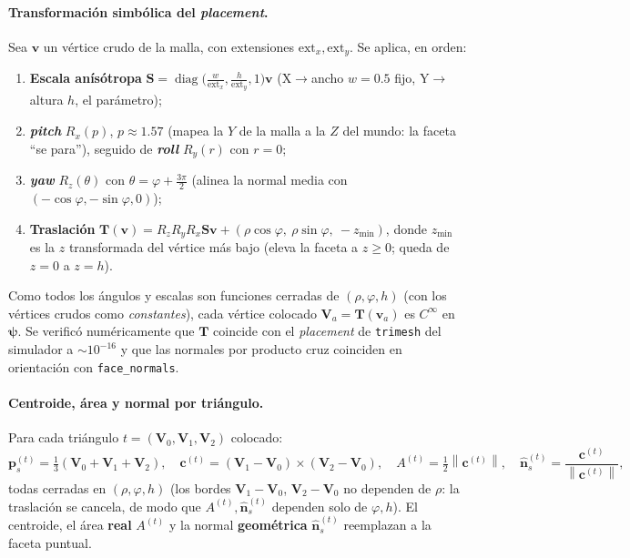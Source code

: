 \documentclass[11pt,a4paper]{article}
\theoremstyle{plain}
\theoremstyle{definition}
\newcommand{\vect}[1]{\boldsymbol{#1}}
\newcommand{\norm}[1]{\left\lVert #1 \right\rVert}
\DeclareMathOperator{\diag}{diag}
\begin{document}
\paragraph{Transformaci\'on simb\'olica del \emph{placement}.} Sea $\vect v$ un
v\'ertice crudo de la malla, con extensiones $\mathrm{ext}_x,\mathrm{ext}_y$. Se
aplica, en orden:
\begin{enumerate}[nosep]
    \item \textbf{Escala an\'is\'otropa} $\vect S=\diag\!\bigl(\tfrac{w}{\mathrm{ext}_x},
    \tfrac{h}{\mathrm{ext}_y},1\bigr)\vect v$ (X$\to$ancho $w=0.5$ fijo,
    Y$\to$altura $h$, el par\'ametro);
    \item \textbf{\emph{pitch}} $R_x(p)$, $p\approx1.57$ (mapea la $Y$ de la malla
    a la $Z$ del mundo: la faceta ``se para''), seguido de \textbf{\emph{roll}}
    $R_y(r)$ con $r=0$;
    \item \textbf{\emph{yaw}} $R_z(\theta)$ con $\theta=\varphi+\tfrac{3\pi}{2}$
    (alinea la normal media con $(-\cos\varphi,-\sin\varphi,0)$);
    \item \textbf{Traslaci\'on} $\vect T(\vect v)=R_z R_y R_x \vect S\vect v
    +(\rho\cos\varphi,\ \rho\sin\varphi,\ -z_{\min})$, donde $z_{\min}$ es la $z$
    transformada del v\'ertice m\'as bajo (eleva la faceta a $z\ge0$; queda de
    $z=0$ a $z=h$).
\end{enumerate}
Como todos los \'angulos y escalas son funciones cerradas de $(\rho,\varphi,h)$
(con los v\'ertices crudos como \emph{constantes}), cada v\'ertice colocado
$\vect V_a=\vect T(\vect v_a)$ es $C^\infty$ en $\vect\psi$. Se verific\'o
num\'ericamente que $\vect T$ coincide con el \emph{placement} de \texttt{trimesh}
del simulador a $\sim\!10^{-16}$ y que las normales por producto cruz coinciden en
orientaci\'on con \texttt{face\_normals}.

\paragraph{Centroide, \'area y normal por tri\'angulo.} Para cada tri\'angulo
$t=(\vect V_0,\vect V_1,\vect V_2)$ colocado:
\begin{equation}
    \vect p_s^{(t)}=\tfrac13(\vect V_0+\vect V_1+\vect V_2),\quad
    \vect c^{(t)}=(\vect V_1-\vect V_0)\times(\vect V_2-\vect V_0),\quad
    A^{(t)}=\tfrac12\norm{\vect c^{(t)}},\quad
    \hat{\vect n}_s^{(t)}=\frac{\vect c^{(t)}}{\norm{\vect c^{(t)}}},
    \label{eq:tri-geom}
\end{equation}
todas cerradas en $(\rho,\varphi,h)$ (los bordes $\vect V_1-\vect V_0$,
$\vect V_2-\vect V_0$ no dependen de $\rho$: la traslaci\'on se cancela, de modo
que $A^{(t)},\hat{\vect n}_s^{(t)}$ dependen solo de $\varphi,h$). El centroide,
el \'area \textbf{real} $A^{(t)}$ y la normal \textbf{geom\'etrica}
$\hat{\vect n}_s^{(t)}$ reemplazan a la faceta puntual.
\end{document}
